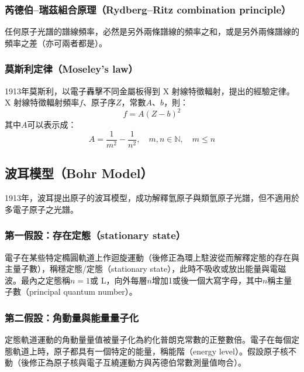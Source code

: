 \documentclass[a4paper,12pt]{report}
\begin{document}
\subsubsection{芮德伯–瑞茲組合原理（Rydberg–Ritz combination principle）}
任何原子光譜的譜線頻率，必然是另外兩條譜線的頻率之和，或是另外兩條譜線的頻率之差（亦可兩者都是）。
\subsubsection{莫斯利定律（Moseley's law）}
1913年莫斯利，以電子轟擊不同金屬板得到 X 射線特徵輻射，提出的經驗定律。X 射線特徵輻射頻率$f$、原子序$Z$，常數$A$、$b$，則：
\[f=A(Z-b)^2\]
其中$A$可以表示成：
\[A=\frac{1}{m^2}-\frac{1}{n^2},\quad m,n\in\mathbb{N},\quad m\leq n\]
\subsection{波耳模型（Bohr Model）}
1913年，波耳提出原子的波耳模型，成功解釋氫原子與類氫原子光譜，但不適用於多電子原子之光譜。
\subsubsection{第一假設：存在定態（stationary state）}
電子在某些特定橢圓軌道上作迴旋運動（後修正為環上駐波從而解釋定態的存在與主量子數），稱穩定態/定態（stationary state），此時不吸收或放出能量與電磁波。最內之定態稱$n=1$或 L，向外每層$n$增加1或後一個大寫字母，其中$n$稱主量子數（principal quantum number）。
\subsubsection{第二假設：角動量與能量量子化}
定態軌道運動的角動量量值被量子化為約化普朗克常數的正整數倍。電子在每個定態軌道上時，原子都具有一個特定的能量，稱能階（energy level）。假設原子核不動（後修正為原子核與電子互繞運動方與芮德伯常數測量值吻合）。
\end{document}

